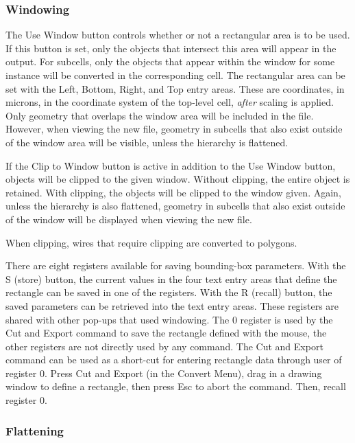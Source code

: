 \subsubsection{Windowing}

The {\cb Use Window} button controls whether or not a rectangular area
is to be used.  If this button is set, only the objects that intersect
this area will appear in the output.  For subcells, only the objects
that appear within the window for some instance will be converted in
the corresponding cell.  The rectangular area can be set with the {\cb
Left}, {\cb Bottom}, {\cb Right}, and {\cb Top} entry areas.  These
are coordinates, in microns, in the coordinate system of the top-level
cell, {\it after} scaling is applied.  Only geometry that overlaps the
window area will be included in the file.  However, when viewing the
new file, geometry in subcells that also exist outside of the window
area will be visible, unless the hierarchy is flattened.

If the {\cb Clip to Window} button is active in addition to the {\cb
Use Window} button, objects will be clipped to the given window. 
Without clipping, the entire object is retained.  With clipping, the
objects will be clipped to the window given.  Again, unless the
hierarchy is also flattened, geometry in subcells that also exist
outside of the window will be displayed when viewing the new file.

When clipping, wires that require clipping are converted to polygons.

There are eight registers available for saving bounding-box
parameters.  With the {\cb S} (store) button, the current values in
the four text entry areas that define the rectangle can be saved in
one of the registers.  With the {\cb R} (recall) button, the saved
parameters can be retrieved into the text entry areas.  These
registers are shared with other pop-ups that used windowing.  The 0
register is used by the {\cb Cut and Export} command to save the
rectangle defined with the mouse, the other registers are not directly
used by any command.  The {\cb Cut and Export} command can be used as
a short-cut for entering rectangle data through user of register 0. 
Press {\cb Cut and Export} (in the {\cb Convert Menu}), drag in a
drawing window to define a rectangle, then press {\kb Esc} to abort
the command.  Then, recall register 0.

\subsubsection{Flattening}

